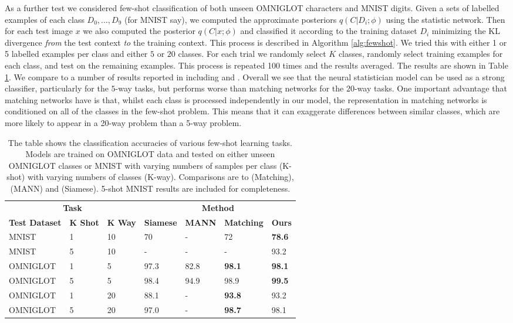 \documentclass{article} \usepackage{iclr2017_conference,times}
\begin{document}
As a further test we considered few-shot classification of both unseen OMNIGLOT characters and MNIST digits. Given a sets of labelled examples of each class $D_0, \dots, D_9$ (for MNIST say), we computed the approximate posteriors $q(C | D_i ; \phi )$ using the statistic network. Then for each test image $x$ we also computed the posterior $q(C | x ; \phi)$ and classified it according to the training dataset $D_i$ minimizing the KL divergence \emph{from} the test context \emph{to} the training context. This process is described in Algorithm \ref{alg:fewshot}. We tried this with either 1 or 5 labelled examples per class and either $5$ or $20$ classes. For each trial we randomly select $K$ classes, randomly select training examples for each class, and test on the remaining examples. This process is repeated 100 times and the results averaged. The results are shown in Table \ref{table:small_shot_classification}. We compare to a number of results reported in \citet{matching} including \citet{mann}  and \citet{siamese_one_shot}. Overall we see that the neural statistician model can be used as a strong classifier, particularly for the $5$-way tasks, but performs worse than matching networks for the $20$-way tasks. One important advantage that matching networks have is that, whilst each class is processed independently in our model, the representation in matching networks is conditioned on all of the classes in the few-shot problem. This means that it can exaggerate differences between similar classes, which are more likely to appear in a 20-way problem than a 5-way problem.
\vspace{-1em}
\begin{table}[!hb]
    \centering
    \begin{tabular}{  l  l  l |  l l l l}
    \multicolumn{3}{c|}{\bf{Task}} & \multicolumn{4}{c}{\bf{Method}} \\
\bf{Test Dataset} & \bf{K Shot} & \bf{K Way}  &\bf{Siamese} & \bf{MANN} & \bf{Matching} & \bf{Ours}  \\ \hline
    MNIST    & 1  & 10  & 70   & -    & 72   & \bf{78.6} \\ 
    MNIST    & 5  & 10  & -    & -    &  -   & 93.2 \\ 
    OMNIGLOT & 1  & 5   & 97.3 & 82.8 & \bf{98.1} & \bf{98.1} \\ 
    OMNIGLOT & 5  & 5   & 98.4 & 94.9 & 98.9 & \bf{99.5} \\ 
    OMNIGLOT & 1  & 20  & 88.1 & -    & \bf{93.8} & 93.2 \\  
    OMNIGLOT & 5  & 20  & 97.0 & -    & \bf{98.7} & 98.1 \\
    \end{tabular}
\caption{The table shows the classification accuracies of various few-shot learning tasks. Models are trained on OMNIGLOT data and tested on either unseen OMNIGLOT classes or MNIST with varying numbers of samples per class (K-shot) with varying numbers of classes (K-way). Comparisons are to \cite{matching} (Matching), \cite{mann} (MANN) and \cite{siamese_one_shot} (Siamese). 5-shot MNIST results are included for completeness.}
\label{table:small_shot_classification}
\end{table}
\end{document}
